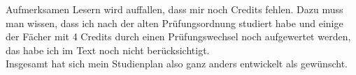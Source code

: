 \begin{multicols}{2}
 Aufmerksamen Lesern wird auffallen, dass
 mir noch Credits fehlen. Dazu muss man wissen, dass ich nach der
 alten Prüfungsordnung studiert habe und einige der Fächer mit 4
 Credits durch einen Prüfungswechsel noch aufgewertet werden, das habe
 ich im Text noch nicht berücksichtigt.\\
Insgesamt hat sich mein Studienplan also
 ganz anders entwickelt als gewünscht.

\end{multicols}
